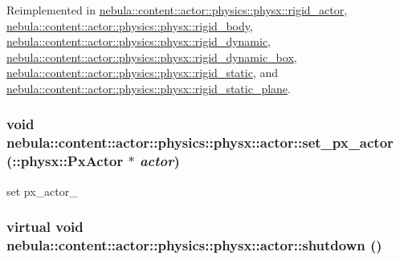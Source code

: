 Reimplemented in \hyperlink{classnebula_1_1content_1_1actor_1_1physics_1_1physx_1_1rigid__actor_a0d7cabcd9cf67f5204e3ec2633e81641}{nebula::content::actor::physics::physx::rigid\_\-actor}, \hyperlink{classnebula_1_1content_1_1actor_1_1physics_1_1physx_1_1rigid__body_a10d2a077db15282d4a53ce95264704a3}{nebula::content::actor::physics::physx::rigid\_\-body}, \hyperlink{classnebula_1_1content_1_1actor_1_1physics_1_1physx_1_1rigid__dynamic_aeb4e0304888f8b4d3fdbebc61eb8a031}{nebula::content::actor::physics::physx::rigid\_\-dynamic}, \hyperlink{classnebula_1_1content_1_1actor_1_1physics_1_1physx_1_1rigid__dynamic__box_ad00353b6787484bdd2619f7294b82afb}{nebula::content::actor::physics::physx::rigid\_\-dynamic\_\-box}, \hyperlink{classnebula_1_1content_1_1actor_1_1physics_1_1physx_1_1rigid__static_adbbf849dd4601c92d5e292ae8158b769}{nebula::content::actor::physics::physx::rigid\_\-static}, and \hyperlink{classnebula_1_1content_1_1actor_1_1physics_1_1physx_1_1rigid__static__plane_a5a8ac2e89cea0594bb1d68fbc038c32a}{nebula::content::actor::physics::physx::rigid\_\-static\_\-plane}.\hypertarget{classnebula_1_1content_1_1actor_1_1physics_1_1physx_1_1actor_af0bdfbbebc3b51c9057f97405364c70c}{
\subsubsection[{set\_\-px\_\-actor}]{\setlength{\rightskip}{0pt plus 5cm}void nebula::content::actor::physics::physx::actor::set\_\-px\_\-actor (::physx::PxActor $\ast$ {\em actor})}}
\label{classnebula_1_1content_1_1actor_1_1physics_1_1physx_1_1actor_af0bdfbbebc3b51c9057f97405364c70c}


set px\_\-actor\_\- \hypertarget{classnebula_1_1content_1_1actor_1_1physics_1_1physx_1_1actor_ad7c3bd724933af584b3884c2613b39a8}{
\subsubsection[{shutdown}]{\setlength{\rightskip}{0pt plus 5cm}virtual void nebula::content::actor::physics::physx::actor::shutdown ()}}
\label{classnebula_1_1content_1_1actor_1_1physics_1_1physx_1_1actor_ad7c3bd724933af584b3884c2613b39a8}


